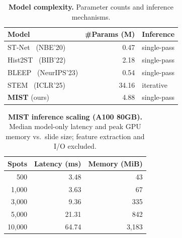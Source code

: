 \documentclass[11pt]{article}
\newcommand{\morph}{\textbf{MIST}}
\begin{document}
\begin{table}[H]
\centering
\caption{\textbf{Model complexity.} Parameter counts and inference mechanisms.}
\label{tab:complexity}
\small
\setlength{\tabcolsep}{5pt}
\begin{tabular}{l r l}
\toprule
Model & \#Params (M) & Inference \\
\midrule
ST-Net~\cite{he2020stnet} (NBE'20)      & 0.47  & single-pass \\
Hist2ST~\cite{zeng2022hist2st} (BIB'22) & 2.18  & single-pass \\
BLEEP~\cite{xie2023bleep} (NeurIPS'23)  & 0.54  & single-pass \\
STEM~\cite{zhu2025diffusion} (ICLR'25)    & 34.16 & iterative \\
\midrule
\morph{} (ours) & 4.88 & single-pass \\
\bottomrule
\end{tabular}
\end{table}

\begin{table}[H]
\centering
\caption{\textbf{\morph{} inference scaling (A100 80GB).} Median model-only latency and peak GPU memory vs.\ slide size; feature extraction and I/O excluded.}
\label{tab:scaling}
\small
\begin{tabular}{r rr}
\toprule
Spots & Latency (ms) & Memory (MiB) \\
\midrule
500    & 3.48  & 43 \\
1,000  & 3.63  & 67 \\
3,000  & 9.36  & 335 \\
5,000  & 21.31 & 842 \\
10,000 & 64.74 & 3,183 \\
\bottomrule
\end{tabular}
\end{table}
\end{document}
